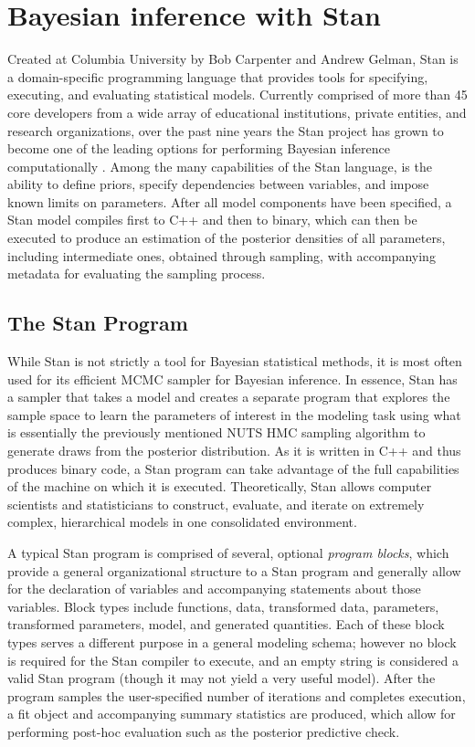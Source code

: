 \documentclass[
  12pt,
]{book}
\theoremstyle{definition}
\theoremstyle{definition}
\theoremstyle{definition}
\theoremstyle{remark}
\begin{document}
\hypertarget{bayesian-inference-with-stan}{%
\chapter{Bayesian inference with Stan}\label{bayesian-inference-with-stan}}

Created at Columbia University by Bob Carpenter and Andrew Gelman, Stan is a domain-specific programming language that provides tools for specifying, executing, and evaluating statistical models.
Currently comprised of more than 45 core developers from a wide array of educational institutions, private entities, and research organizations, over the past nine years the Stan project has grown to become one of the leading options for performing Bayesian inference computationally \citep{Stan2021}.
Among the many capabilities of the Stan language, is the ability to define priors, specify dependencies between variables, and impose known limits on parameters.
After all model components have been specified, a Stan model compiles first to C++ and then to binary, which can then be executed to produce an estimation of the posterior densities of all parameters, including intermediate ones, obtained through sampling, with accompanying metadata for evaluating the sampling process.

\hypertarget{the-stan-program}{%
\section{The Stan Program}\label{the-stan-program}}

While Stan is not strictly a tool for Bayesian statistical methods, it is most often used for its efficient MCMC sampler for Bayesian inference.
In essence, Stan has a sampler that takes a model and creates a separate program that explores the sample space to learn the parameters of interest in the modeling task using what is essentially the previously mentioned NUTS HMC sampling algorithm to generate draws from the posterior distribution.
As it is written in C++ and thus produces binary code, a Stan program can take advantage of the full capabilities of the machine on which it is executed.
Theoretically, Stan allows computer scientists and statisticians to construct, evaluate, and iterate on extremely complex, hierarchical models in one consolidated environment.

A typical Stan program is comprised of several, optional \emph{program blocks}, which provide a general organizational structure to a Stan program and generally allow for the declaration of variables and accompanying statements about those variables.
Block types include functions, data, transformed data, parameters, transformed parameters, model, and generated quantities.
Each of these block types serves a different purpose in a general modeling schema; however no block is required for the Stan compiler to execute, and an empty string is considered a valid Stan program (though it may not yield a very useful model).
After the program samples the user-specified number of iterations and completes execution, a fit object and accompanying summary statistics are produced, which allow for performing post-hoc evaluation such as the posterior predictive check.
\end{document}
